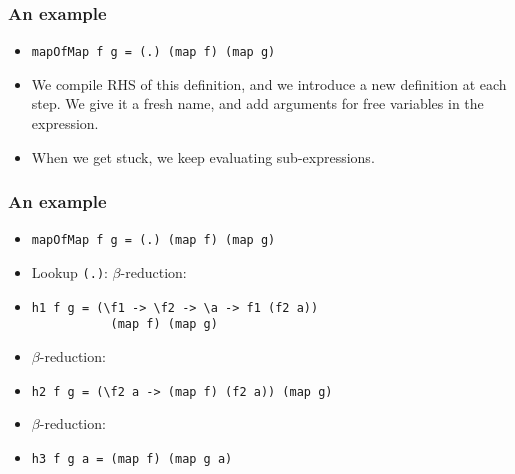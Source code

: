 \documentclass{beamer}
\begin{document}
\begin{frame}[fragile]

    \frametitle{An example}

    \begin{itemize}[<+->]
        \item[]
            \begin{verbatim}
mapOfMap f g = (.) (map f) (map g)
            \end{verbatim}

        \item[]
            We compile RHS of this definition, and we introduce a new definition
            at each step. We give it a fresh name, and add arguments for free
            variables in the expression.

        \item[]
            When we get stuck, we keep evaluating sub-expressions.

    \end{itemize}

\end{frame}

\begin{frame}[fragile]

    \frametitle{An example}

    \begin{itemize}[<+->]

        \item[]
            \begin{verbatim}
mapOfMap f g = (.) (map f) (map g)
            \end{verbatim}

        \item[]
            Lookup \texttt{(.)}:
            $\beta$-reduction:

        \item[]
            \begin{verbatim}
h1 f g = (\f1 -> \f2 -> \a -> f1 (f2 a))
           (map f) (map g)
            \end{verbatim}

        \item[]
            $\beta$-reduction:

        \item[]
            \begin{verbatim}
h2 f g = (\f2 a -> (map f) (f2 a)) (map g)
            \end{verbatim}

        \item[]
            $\beta$-reduction:

        \item[]
            \begin{verbatim}
h3 f g a = (map f) (map g a)
            \end{verbatim}

    \end{itemize}

\end{frame}
\end{document}
